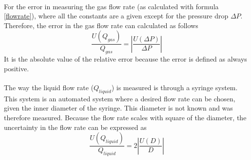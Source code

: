 \\
For the error in measuring the gas flow rate (as calculated with formula \ref{flowrate}), where all the constants are a given except for the pressure drop $\Delta P$. Therefore, the error in the gas flow rate can calculated as follows
\begin{equation}
\frac{U(Q_{gas})}{Q_{gas}} = \left|\frac{U(\Delta P)}{\Delta P}\right|
\end{equation}
It is the absolute value of the relative error because the error is defined as always positive. \\
\\
The way the liquid flow rate ($Q_{liquid}$) is measured is through a syringe system. This system is an automated system where a desired flow rate can be chosen, given the inner diameter of the syringe. This diameter is not known and was therefore measured. Because the flow rate scales with square of the diameter, the uncertainty in the flow rate can be expressed as
\begin{equation}
\frac{U(Q_{liquid})}{Q_{liquid}} = 2\left|\frac{U(D)}{D}\right|
\end{equation}
